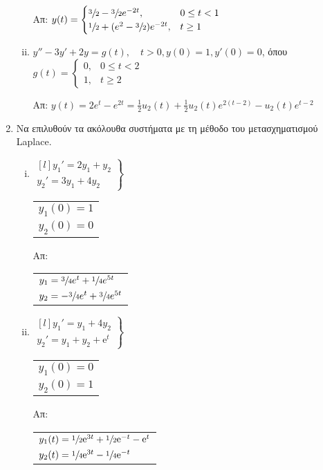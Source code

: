 \begin{enumerate}
\begin{enumerate}[i)]
        \hfill Απ: $y(t)=
        \begin{cases} 
          \sfrac{3}{2}-\sfrac{3}{2}e^{-2t},& 0\leq t<1 \\ 
          \sfrac{1}{2}+(e^2-\sfrac{3}{2})e^{-2t}, & t\geq 1
        \end{cases}$

      \item $y''-3y'+2y=g(t),\quad t>0, y(0)=1, y'(0)=0$, 
        όπου $g(t)=
        \begin{cases} 
          0, & 0\leq t<2 \\ 1, & t\geq 2
        \end{cases}$

        \hfill Απ: $y(t)=2e^t-e^{2t}=\frac{1}{2}u_{2}(t)+
        \frac{1}{2}u_{2}(t)e^{2(t-2)}-u_{2}(t)e^{t-2} $
    \end{enumerate}

  \item Να επιλυθούν τα ακόλουθα συστήματα με τη μέθοδο του μετασχηματισμού Laplace.
    \begin{enumerate}[i)]
      \item 
        $ 
        \left.
          \begin{matrix*}[l]
            y_1'=2y_1+y_2 \\ y_2'=3y_1+4y_2
          \end{matrix*} 
        \right\} $ 
        \quad {} \quad 
        \begin{tabular}{l}
          $ y_{1}(0)=1 $ \\
          $ y_{2}(0)=0 $ 
        \end{tabular}
        \hfill Απ: 
        \begin{tabular}{l} 
          $y_1=\sfrac{3}{4}e^{t}+ \sfrac{1}{4} e^{5t}$ \\
          $y_2=-\sfrac{3}{4}e^{t}+\sfrac{3}{4}e^{5t}$
        \end{tabular}

      \item 
        $ 
        \left.
          \begin{matrix*}[l]
            y_{1}' =  y_{1}+ 4y_{2} \\
            y_{2}' = y_{1}+  y_{2}+ \mathrm{e}^{t} 
          \end{matrix*} 
        \right\} $ \quad {} \quad 
        \begin{tabular}{l}
          $y_{1}(0)=0$ \\
          $y_{2}(0) =1$
        \end{tabular} 
        \hfill Απ: 
        \begin{tabular}{l}
          $ y_{1}(t) = \sfrac{1}{2} \mathrm{e}^{3t} + \sfrac{1}{2}
          \mathrm{e}^{-t} - \mathrm{e}^{t} $
          \\
          $ y_{2}(t) = \sfrac{1}{4} \mathrm{e}^{3t} - \sfrac{1}{4} \mathrm{e}^{-t} $
        \end{tabular}


\end{enumerate}
\end{enumerate}
